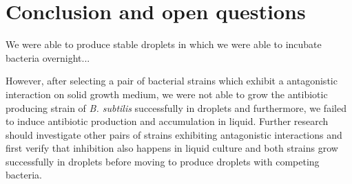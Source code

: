 \chapter{Conclusion and open questions}
\label{chap:droplets_conclusion}

We were able to produce stable droplets in which we were able to incubate bacteria overnight...

However, after selecting a pair of bacterial strains which exhibit a antagonistic interaction on solid growth medium, we were not able to grow the antibiotic producing strain of \textit{B. subtilis} successfully in droplets and furthermore, we failed to induce antibiotic production and accumulation in liquid.
Further research should investigate other pairs of strains exhibiting antagonistic interactions and first verify that inhibition also happens in liquid culture and both strains grow successfully in droplets before moving to produce droplets with competing bacteria.